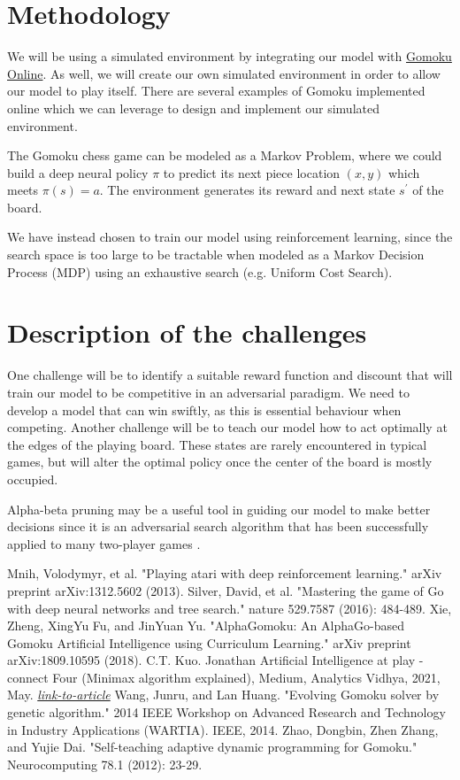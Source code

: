 \documentclass[conference]{IEEEtran}
\begin{document}
\section{Methodology}
We will be using a simulated environment by integrating our model with \href{https://gomokuonline.com}{Gomoku Online}. As well, we will create our own simulated environment in order to allow our model to play itself. There are several examples of Gomoku implemented online which we can leverage to design and implement our simulated environment.

The Gomoku chess game can be modeled as a Markov Problem, where we could build a deep neural policy $\pi$ to predict its next piece location $(x, y)$ which meets $\pi(s) = a$. The environment generates its reward and next state $s^\prime$ of the board.

We have instead chosen to train our model using reinforcement learning, since the search space is too large to be tractable when modeled as a Markov Decision Process (MDP) using an exhaustive search (e.g. Uniform Cost Search).

\section{Description of the challenges}
One challenge will be to identify a suitable reward function and discount that will train our model to be competitive in an adversarial paradigm. We need to develop a model that can win swiftly, as this is essential behaviour when competing. Another challenge will be to teach our model how to act optimally at the edges of the playing board. These states are rarely encountered in typical games, but will alter the optimal policy once the center of the board is mostly occupied.

Alpha-beta pruning may be a useful tool in guiding our model to make better decisions since it is an adversarial search algorithm that has been successfully applied to many two-player games \cite{b4}.

\begin{thebibliography}{00}
 Mnih, Volodymyr, et al. "Playing atari with deep reinforcement learning." arXiv preprint arXiv:1312.5602 (2013).
Silver, David, et al. "Mastering the game of Go with deep neural networks and tree search." nature 529.7587 (2016): 484-489.
Xie, Zheng, XingYu Fu, and JinYuan Yu. "AlphaGomoku: An AlphaGo-based Gomoku Artificial Intelligence using Curriculum Learning." arXiv preprint arXiv:1809.10595 (2018).
 C.T. Kuo. Jonathan Artificial Intelligence at play - connect Four (Minimax algorithm explained), Medium, Analytics Vidhya, 2021, May. \href{https://medium.com/analytics-vidhya/artificial-intelligence-at-play-connect-four-minimax-algorithm-explained-3b5fc32e4a4f}{\textit{link-to-article}}
Wang, Junru, and Lan Huang. "Evolving Gomoku solver by genetic algorithm." 2014 IEEE Workshop on Advanced Research and Technology in Industry Applications (WARTIA). IEEE, 2014.
Zhao, Dongbin, Zhen Zhang, and Yujie Dai. "Self-teaching adaptive dynamic programming for Gomoku." Neurocomputing 78.1 (2012): 23-29.

\end{thebibliography}
\end{document}
